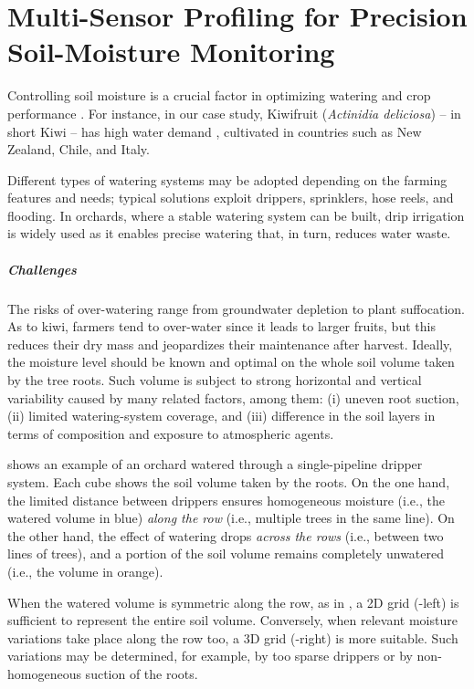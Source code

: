 
\chapter{Multi-Sensor Profiling for Precision Soil-Moisture Monitoring}
\label{physics-aware-chap:pluto}

Controlling soil moisture is a crucial factor in optimizing watering and crop performance \cite{turkeltaub2016real}.
For instance, in our case study, Kiwifruit (\emph{Actinidia deliciosa}) -- in short Kiwi -- has high water demand \cite{judd1986water}, cultivated in countries such as New Zealand, Chile, and Italy.

Different types of watering systems may be adopted depending on the farming features and needs; typical solutions exploit drippers, sprinklers, hose reels, and flooding.
In orchards, where a stable watering system can be built, drip irrigation is widely used as it enables precise watering that, in turn, reduces water waste.

\paragraph{Challenges}
The risks of over-watering range from groundwater depletion to plant suffocation.
As to kiwi, farmers tend to over-water since it leads to larger fruits, but this reduces their dry mass and jeopardizes their maintenance after harvest.
Ideally, the moisture level should be known and optimal on the whole soil volume taken by the tree roots.
Such volume is subject to strong horizontal and vertical variability caused by many related factors, among them: (i) uneven root suction, (ii) limited watering-system coverage, and (iii) difference in the soil layers in terms of composition and exposure to atmospheric agents. %

 shows an example of an orchard watered through a single-pipeline dripper system.
Each cube shows the soil volume taken by the roots.
On the one hand, the limited distance between drippers ensures homogeneous moisture (i.e., the watered volume in blue) \textit{along the row} (i.e., multiple trees in the same line).
On the other hand, the effect of watering drops \textit{across the rows} (i.e., between two lines of trees), and a portion of the soil volume remains completely unwatered (i.e., the volume in orange).

When the watered volume is symmetric along the row, as in , a 2D grid (-left) is sufficient to represent the entire soil volume. Conversely, when relevant moisture variations take place along the row too, a 3D grid (-right) is more suitable. Such variations may be determined, for example, by too sparse drippers or by non-homogeneous suction of the roots.

